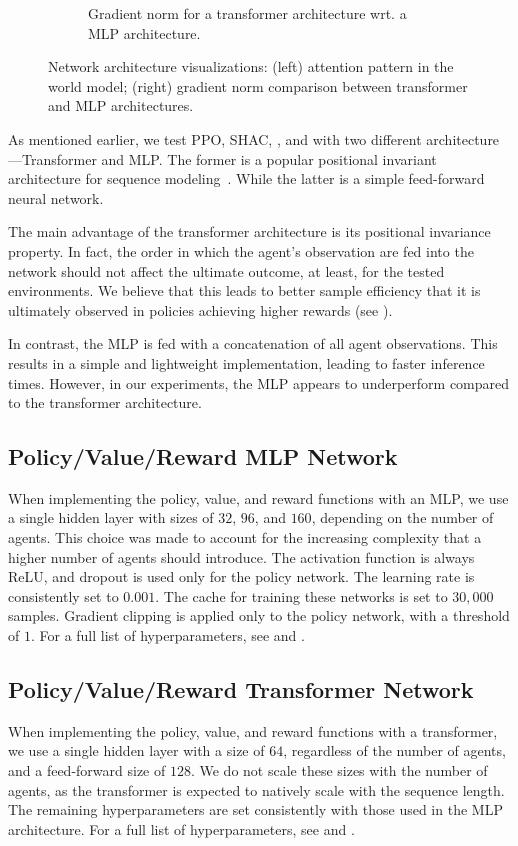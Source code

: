 \begin{figure}[t]
\begin{subfigure}[b]{0.45\textwidth}
        \caption{Gradient norm for a transformer architecture wrt. a MLP architecture.}
        \label{fig:grads-mlp}
    \end{subfigure}
    \caption{Network architecture visualizations: (left) attention pattern in the world model; (right) gradient norm comparison between transformer and MLP architectures.}
    \label{fig:combined-arch}
    \vspace{0.5cm}
\end{figure}
As mentioned earlier, we test PPO, SHAC, \fname{}, and \fnamer{} with two different architecture---Transformer and MLP. The former is a popular positional invariant architecture for sequence modeling~\cite{Vaswani17}. While the latter is a simple feed-forward neural network.

The main advantage of the transformer architecture is its positional invariance property. In fact, the order in which the agent's observation are fed into the network should not affect the ultimate outcome, at least, for the tested environments. We believe that this leads to better sample efficiency that it is ultimately observed in policies achieving higher rewards (see ). 

In contrast, the MLP is fed with a concatenation of all agent observations. This results in a simple and lightweight implementation, leading to faster inference times. However, in our experiments, the MLP appears to underperform compared to the transformer architecture.

\subsection{Policy/Value/Reward MLP Network}
When implementing the policy, value, and reward functions with an MLP, we use a single hidden layer with sizes of $32$, $96$, and $160$, depending on the number of agents. This choice was made to account for the increasing complexity that a higher number of agents should introduce. The activation function is always ReLU, and dropout is used only for the policy network. The learning rate is consistently set to $0.001$. The cache for training these networks is set to $30,000$ samples. Gradient clipping is applied only to the policy network, with a threshold of $1$. For a full list of hyperparameters, see  and .

\subsection{Policy/Value/Reward Transformer Network}
When implementing the policy, value, and reward functions with a transformer, we use a single hidden layer with a size of $64$, regardless of the number of agents, and a feed-forward size of $128$. We do not scale these sizes with the number of agents, as the transformer is expected to natively scale with the sequence length. The remaining hyperparameters are set consistently with those used in the MLP architecture. For a full list of hyperparameters, see  and .


